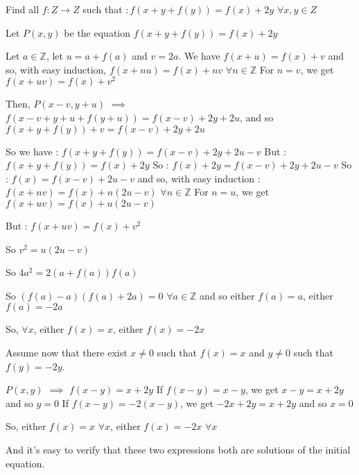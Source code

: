 \begin{solution}
	\begin{tcolorbox}Find all $ f: Z\rightarrow Z$ such that $ : f(x + y + f(y)) = f(x) + 2y$  $ \forall x,y\in Z$\end{tcolorbox}
Let $ P(x,y)$ be the equation $ f(x+y+f(y))=f(x)+2y$

Let $ a\in\mathbb{Z}$, let $ u=a+f(a)$ and $ v=2a$. We have $ f(x+u)=f(x)+v$ and so, with easy induction, $ f(x+nu)=f(x)+nv$ $ \forall n\in\mathbb{Z}$
For $ n=v$, we get $ f(x+uv)=f(x)+v^2$

Then, $ P(x-v,y+u)$ $ \implies$ $ f(x-v+y+u+f(y+u))=f(x-v)+2y+2u$, and so $ f(x+y+f(y))+v=f(x-v)+2y+2u$

So we have : $ f(x+y+f(y))=f(x-v)+2y+2u-v$
But : $ f(x+y+f(y))=f(x)+2y$ 
So : $ f(x)+2y = f(x-v)+2y+2u-v$
So : $ f(x)=f(x-v)+2u-v$ and so, with easy induction : $ f(x+nv)=f(x)+n(2u-v)$ $ \forall n\in\mathbb{Z}$
For $ n=u$, we get $ f(x+uv)=f(x)+u(2u-v)$

But : $ f(x+uv)=f(x)+v^2$

So $ v^2=u(2u-v)$

So $ 4a^2=2(a+f(a))f(a)$

So $ (f(a)-a)(f(a)+2a)=0$ $ \forall a\in\mathbb{Z}$ and so either $ f(a)=a$, either $ f(a)=-2a$

So, $ \forall x$, either $ f(x)=x$, either $ f(x)=-2x$

Assume now that there exist $ x\neq 0$ such that $ f(x)=x$ and $ y\neq 0$ such that $ f(y)=-2y$.

$ P(x,y)$ $ \implies$ $ f(x-y)=x+2y$
If $ f(x-y)=x-y$, we get $ x-y=x+2y$ and so $ y=0$
If $ f(x-y)=-2(x-y)$, we get $ -2x+2y=x+2y$ and so $ x=0$

So, either $ f(x)=x$ $ \forall x$, either $ f(x)=-2x$ $ \forall x$

And it's easy to verify that these two expressions both are solutions of the initial equation.
\end{solution}



